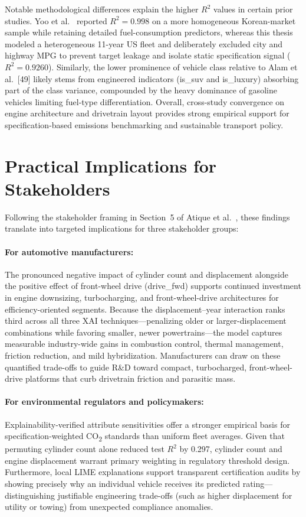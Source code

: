 Notable methodological differences explain the higher \(R^2\) values in certain prior studies. Yoo et al.~\cite{yoo2025machine} reported \(R^2 = 0.998\) on a more homogeneous Korean-market sample while retaining detailed fuel-consumption predictors, whereas this thesis modeled a heterogeneous 11-year US fleet and deliberately excluded city and highway MPG to prevent target leakage and isolate static specification signal (\(R^2 = 0.9260\)). Similarly, the lower prominence of vehicle class relative to Alam et al.~[49] likely stems from engineered indicators (is\_suv and is\_luxury) absorbing part of the class variance, compounded by the heavy dominance of gasoline vehicles limiting fuel-type differentiation. Overall, cross-study convergence on engine architecture and drivetrain layout provides strong empirical support for specification-based emissions benchmarking and sustainable transport policy.


\section{Practical Implications for Stakeholders}

Following the stakeholder framing in Section~5 of Atique et al.~\cite{atique2026explainable}, these findings translate into targeted implications for three stakeholder groups:

\paragraph{For automotive manufacturers:}
The pronounced negative impact of cylinder count and displacement alongside the positive effect of front-wheel drive (drive\_fwd) supports continued investment in engine downsizing, turbocharging, and front-wheel-drive architectures for efficiency-oriented segments. Because the displacement--year interaction ranks third across all three XAI techniques---penalizing older or larger-displacement combinations while favoring smaller, newer powertrains---the model captures measurable industry-wide gains in combustion control, thermal management, friction reduction, and mild hybridization. Manufacturers can draw on these quantified trade-offs to guide R\&D toward compact, turbocharged, front-wheel-drive platforms that curb drivetrain friction and parasitic mass.

\paragraph{For environmental regulators and policymakers:}
Explainability-verified attribute sensitivities offer a stronger empirical basis for specification-weighted CO\textsubscript{2} standards than uniform fleet averages. Given that permuting cylinder count alone reduced test \(R^2\) by 0.297, cylinder count and engine displacement warrant primary weighting in regulatory threshold design. Furthermore, local LIME explanations support transparent certification audits by showing precisely why an individual vehicle receives its predicted rating---distinguishing justifiable engineering trade-offs (such as higher displacement for utility or towing) from unexpected compliance anomalies.

